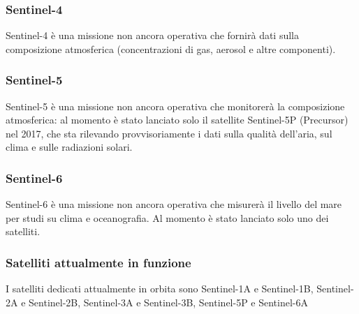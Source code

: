 \subsubsection{Sentinel-4}
Sentinel-4 è una missione non ancora operativa che fornirà dati sulla composizione 
atmosferica (concentrazioni di gas, aerosol e altre componenti).


\subsubsection{Sentinel-5}
Sentinel-5 è una missione non ancora operativa che monitorerà la composizione 
atmosferica: al momento è stato lanciato solo il satellite Sentinel-5P (Precursor) nel 2017, 
che sta rilevando provvisoriamente i dati sulla qualità dell’aria, sul clima e sulle 
radiazioni solari. 


\subsubsection{Sentinel-6}
Sentinel-6 è una missione non ancora operativa che misurerà il livello del mare per studi 
su clima e oceanografia. Al momento è stato lanciato solo uno dei satelliti.


\subsubsection{Satelliti attualmente in funzione}
I satelliti dedicati attualmente in orbita sono Sentinel-1A e Sentinel-1B, Sentinel-2A e 
Sentinel-2B, Sentinel-3A e Sentinel-3B, Sentinel-5P e Sentinel-6A 


